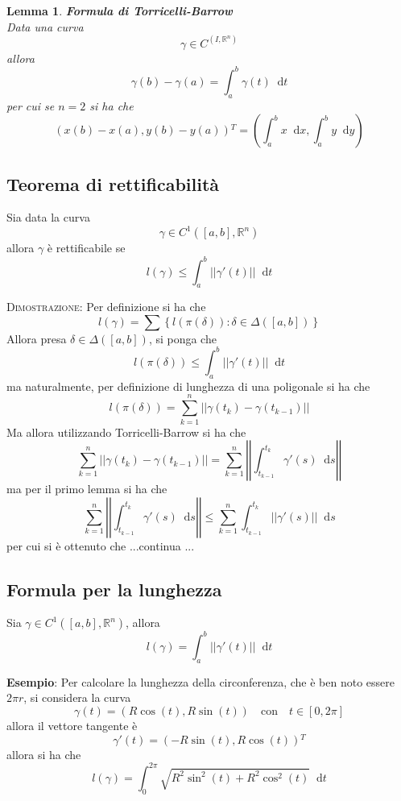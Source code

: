 \documentclass[a4paper]{extarticle}
\newtheorem{lemma}[theorem]{Lemma}
\newcommand*\dif{\mathop{}\!\mathrm{d}}
\begin{document}
\begin{lemma}\textbf{Formula di Torricelli-Barrow}\\
    Data una curva
    \[\gamma \in C^(I,\mathbb{R}^n)\]
    allora
    \[\gamma(b) - \gamma(a) = \int_a^b \gamma(t) \dif t\]
    per cui se $n=2$ si ha che
    \[(x(b)-x(a),y(b)-y(a)){^T} = \left(\int_a^b x \dif x, \int_a^b y \dif y \right)\]
\end{lemma}

\vspace{1em}
\subsection{Teorema di rettificabilità}
Sia data la curva
\[\gamma \in C^1 \left([a,b], \mathbb{R}^n\right)\]
allora $\gamma$ è rettificabile se
\[l(\gamma) \leq \int_a^b \vert \vert \gamma'(t) \vert \vert \dif t\]

\vspace{2em}
\noindent
\normalfont \normalsize
\textsc{Dimostrazione}: Per definizione si ha che
\[l(\gamma) = \sum \left\{l(\pi(\delta)) : \delta \in \Delta([a,b])\right\}\]
Allora presa $\delta \in \Delta([a,b])$, si ponga che
\[l(\pi(\delta)) \leq \int_a^b \vert \vert \gamma'(t) \vert \vert \dif t\]
ma naturalmente, per definizione di lunghezza di una poligonale si ha che
\[l(\pi(\delta)) = \sum_{k=1}^n \left \vert \left \vert \gamma(t_k) - \gamma(t_{k-1}) \right \vert \right \vert\]
Ma allora utilizzando Torricelli-Barrow si ha che
\[\sum_{k=1}^n \left \vert \left \vert \gamma(t_k) - \gamma(t_{k-1}) \right \vert \right \vert = \sum_{k=1}^n \left \vert \left \vert \int_{t_{k-1}}^{t_k} \gamma'(s) \dif s \right \vert \right \vert\]
ma per il primo lemma si ha che
\[\sum_{k=1}^n \left \vert \left \vert \int_{t_{k-1}}^{t_k} \gamma'(s) \dif s \right \vert \right \vert \leq \sum_{k=1}^n \int_{t_{k-1}}^{t_k} \left \vert \left \vert \gamma'(s) \right \vert \right \vert \dif s\]
per cui si è ottenuto che ...continua ...

\vspace{1em}
\noindent
\subsection{Formula per la lunghezza}
Sia $\gamma \in C^1([a,b],\mathbb{R}^n)$, allora
\[l(\gamma) = \int_a^b \vert \vert \gamma'(t) \vert \vert \dif t\]

\vspace{2em}
\noindent
\textbf{Esempio}: Per calcolare la lunghezza della circonferenza, che è ben noto essere $2\pi r$, si considera la curva
\[\gamma(t) = \left(R \cos(t), R \sin(t)\right) \hspace{1em} \text{con} \hspace{1em} t \in [0,2\pi]\]
allora il vettore tangente è
\[\gamma'(t) = (-R \sin(t), R \cos(t)){^T}\]
allora si ha che
\[l(\gamma) = \int_0^{2\pi} \sqrt{R^2 \sin^2(t) + R^2 \cos^2(t)} \dif t\]
\end{document}
